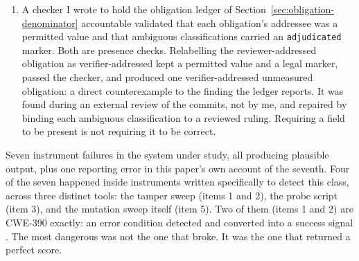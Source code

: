 \documentclass[11pt]{article}
\begin{document}
\begin{enumerate}
unrelated reason: \texttt{VAC\_CERTLAB\_CHECKOUT} and \texttt{VAC\_FLEET\_CHECKOUT} are never
set by the workflow at all, so agent-certlab's seven registry entries and reference-fleet's one
were never in reach. Two independent causes, one silent zero, and the totals hide the seam.
Nothing in the log gives it away, which is the point: the
\texttt{refusal-coverage} job emits no pytest tally at all, because the sweep captures
pytest's output and prints only its own lines. What does give it away is that the job's score
at \texttt{92e4548} is $143/143$, identical to a sweep run with the variables unset. An
earlier draft cited the \texttt{238 passed, 16 skipped, 4 xfailed} line as the evidence; that
line is emitted by the \texttt{test (3.11)} and \texttt{test (3.12)} jobs, which never check
the issuers out and were never meant to, so it could not evidence anything about
\texttt{refusal-coverage}. Citing the wrong job's output for a claim about instrument blindness is a reporting error
rather than an instrument failure: no tool returned success without measuring, I cited the
wrong measurement. It is recorded here rather than silently repaired, and the underlying
defect stands on the path arithmetic above, not on the line I misquoted.
\item A checker I wrote to hold the obligation ledger of
Section~\ref{sec:obligation-denominator} accountable validated that each obligation's addressee
was a permitted value and that ambiguous classifications carried an \texttt{adjudicated} marker.
Both are presence checks. Relabelling the reviewer-addressed obligation as verifier-addressed
kept a permitted value and a legal marker, passed the checker, and produced one
verifier-addressed unmeasured obligation: a direct counterexample to the finding the ledger
reports. It was found during an external review of the commits, not by me, and repaired by
binding each ambiguous classification to a reviewed ruling. Requiring a field to be present is
not requiring it to be correct.

\end{enumerate}

Seven instrument failures in the system under study, all producing plausible output, plus one
reporting error in this paper's own account of the seventh. Four of the seven happened
inside instruments written specifically to detect this class, across three distinct tools: the
tamper sweep (items 1 and 2), the probe script (item 3), and the mutation sweep itself
(item 5). Two of them (items 1 and 2) are CWE-390 exactly: an error condition detected and
converted into a success signal \citep{cwe390}. The most dangerous was not the one that broke.
It was the one that returned a perfect score.
\end{document}
